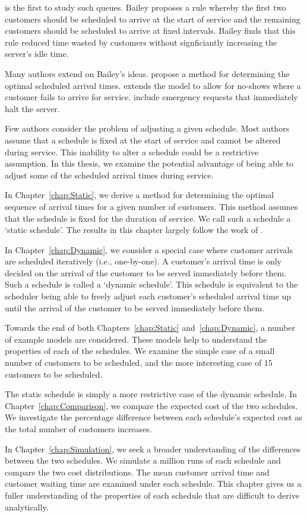 \citet{Bailey} is the first to study such queues. Bailey proposes a rule whereby the first two customers should be scheduled to arrive at the start of service and the remaining customers should be scheduled to arrive at fixed intervals. Bailey finds that this rule reduced time wasted by customers without signficiantly increasing the server's idle time.

Many authors extend on Bailey's ideas. \citet{Pegden} propose a method for determining the optimal scheduled arrival times. \citet{Mendel} extends the model to allow for no-shows where a customer fails to arrive for service. \citet{Fiems} include emergency requests that immediately halt the server.

Few authors consider the problem of adjusting a given schedule. Most authors assume that a schedule is fixed at the start of service and cannot be altered during service. This inability to alter a schedule could be a restrictive assumption. In this thesis, we examine the potential advantage of being able to adjust some of the scheduled arrival times during service.

In Chapter~\ref{chap:Static}, we derive a method for determining the optimal sequence of arrival times for a given number of customers. This method assumes that the schedule is fixed for the duration of service. We call such a schedule a `static schedule'. The results in this chapter largely follow the work of \citet{Pegden}.

In Chapter~\ref{chap:Dynamic}, we consider a special case where customer arrivals are scheduled iteratively (i.e., one-by-one). A customer's arrival time is only decided on the arrival of the customer to be served immediately before them. Such a schedule is called a `dynamic schedule'. This schedule is equivalent to the scheduler being able to freely adjust each customer's scheduled arrival time up until the arrival of the customer to be served immediately before them.

Towards the end of both Chapters~\ref{chap:Static} and~\ref{chap:Dynamic}, a number of example models are considered. These models help to understand the properties of each of the schedules. We examine the simple case of a small number of customers to be scheduled, and the more interesting case of $15$ customers to be scheduled.

The static schedule is simply a more restrictive case of the dynamic schedule. In Chapter~\ref{chap:Comparison}, we compare the expected cost of the two schedules. We investigate the percentage difference between each schedule's expected cost as the total number of customers increases.

In Chapter~\ref{chap:Simulation}, we seek a broader understanding of the differences between the two schedules. We simulate a million runs of each schedule and compare the two cost distributions. The mean customer arrival time and customer waiting time are examined under each schedule. This chapter gives us a fuller understanding of the properties of each schedule that are difficult to derive analytically.